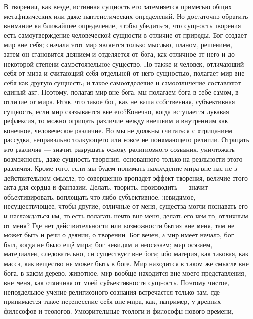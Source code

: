 \documentclass[12pt,oneside]{book}
\begin{document}
В творении, как везде, истинная сущность его затемняется примесью общих метафизических или даже пантеистических определений. Но достаточно обратить внимание на ближайшее определение, чтобы убедиться, что сущность творения есть самоутверждение человеческой сущности в отличие от природы. Бог создает мир вне себя; сначала этот мир является только мыслью, планом, решением, затем он становится деянием и отделяется от бога, как отличное от него и до некоторой степени самостоятельное существо. Но также и человек, отличающий себя от мира и считающий себя отдельной от него сущностью, полагает мир вне себя как другую сущность; и такое самоотделение и самоотличение составляют единый акт. Поэтому, полагая мир вне бога, мы полагаем бога в себе самом, в отличие от мира. Итак, что такое бог, как не ваша собственная, субъективная сущность, если мир сказывается вне его?\ddag\let\svthefootnote\thefootnote\let\thefootnote\relax{}\let\thefootnote\svthefootnote Конечно, когда вступается лукавая рефлексия, то можно отрицать различие между внешним и внутренним как конечное, человеческое различие. Но мы не должны считаться с отрицанием рассудка, неправильно толкующего или вовсе не понимающего религии. Отрицать это различие --- значит разрушать основу религиозного сознания, уничтожать возможность, даже сущность творения, основанного только на реальности этого различия. Кроме того, если мы будем понимать нахождение мира вне нас не в действительном смысле, то совершенно пропадет эффект творения, величие этого акта для сердца и фантазии. Делать, творить, производить --- значит объективировать, воплощать что-либо субъективное, невидимое, несуществующее, чтобы другие, отличные от меня, существа могли познавать его и наслаждаться им, то есть полагать нечто вне меня, делать его чем-то, отличным от меня? Где нет действительности или возможности бытия вне меня, там не может быть и речи о деянии, о творении. Бог вечен, а мир имеет начало; бог был, когда не было ещё мира; бог невидим и неосязаем; мир осязаем, материален, следовательно, он существует вне бога; ибо материя, как таковая, как масса, как вещество не может быть в боге. Мир находится в таком же смысле вне бога, в каком дерево, животное, мир вообще находится вне моего представления, вне меня, как отличная от моей субъективности сущность. Поэтому чистое, неподдельное учение религиозного сознания встречается только там, где принимается такое перенесение себя вне мира, как, например, у древних философов и теологов. Умозрительные теологи и философы нового времени, 
\end{document}
